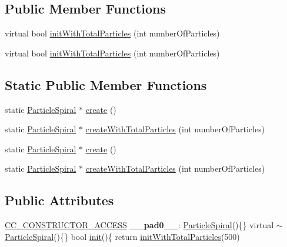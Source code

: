 \subsection*{Public Member Functions}
\begin{DoxyCompactItemize}
\item 
virtual bool \hyperlink{classParticleSpiral_a49dc3c1355ebb9f008ae4693bed70f58}{init\+With\+Total\+Particles} (int number\+Of\+Particles)
\item 
virtual bool \hyperlink{classParticleSpiral_a299f8e70bf5cafcbd4ff7defc8912a42}{init\+With\+Total\+Particles} (int number\+Of\+Particles)
\end{DoxyCompactItemize}
\subsection*{Static Public Member Functions}
\begin{DoxyCompactItemize}
\item 
static \hyperlink{classParticleSpiral}{Particle\+Spiral} $\ast$ \hyperlink{classParticleSpiral_a521efb3bd2e5960e518d8aabbeef077e}{create} ()
\item 
static \hyperlink{classParticleSpiral}{Particle\+Spiral} $\ast$ \hyperlink{classParticleSpiral_a97e226600f4bfced04176e665f8c6e27}{create\+With\+Total\+Particles} (int number\+Of\+Particles)
\item 
static \hyperlink{classParticleSpiral}{Particle\+Spiral} $\ast$ \hyperlink{classParticleSpiral_a9d7396d56d63a590a223f9ddd8f4649d}{create} ()
\item 
static \hyperlink{classParticleSpiral}{Particle\+Spiral} $\ast$ \hyperlink{classParticleSpiral_ace847f71cef983bde3f64dae6a6946a6}{create\+With\+Total\+Particles} (int number\+Of\+Particles)
\end{DoxyCompactItemize}
\subsection*{Public Attributes}
\begin{DoxyCompactItemize}
\item 
\mbox{\label{classParticleSpiral_a5fc4e1944f58b77f7e846f94fdd02306}} 
\hyperlink{_2cocos2d_2cocos_2base_2ccConfig_8h_a25ef1314f97c35a2ed3d029b0ead6da0}{C\+C\+\_\+\+C\+O\+N\+S\+T\+R\+U\+C\+T\+O\+R\+\_\+\+A\+C\+C\+E\+SS} {\bfseries \+\_\+\+\_\+pad0\+\_\+\+\_\+}\+: \hyperlink{classParticleSpiral}{Particle\+Spiral}()\{\} virtual $\sim$\hyperlink{classParticleSpiral}{Particle\+Spiral}()\{\} bool \hyperlink{classParticleSystem_a65c05b30432f6e8aeb45ba018f3a8d3f}{init}()\{ return \hyperlink{classParticleSpiral_a49dc3c1355ebb9f008ae4693bed70f58}{init\+With\+Total\+Particles}(500)
\end{DoxyCompactItemize}
